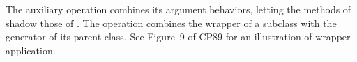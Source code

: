 \begin{AgdaAlign}
The auxiliary operation  combines its argument behaviors,
letting the methods of  shadow those of .
The operation  combines the wrapper of a subclass with the generator of its parent class.
See Figure~9 of CP89 for an illustration of wrapper application.
%
\begin{code}%
%
\>[2]\AgdaSpace{}%
\AgdaSymbol{=}\AgdaSpace{}%
\AgdaSpace{}%
\AgdaSpace{}%
\AgdaSpace{}%
\AgdaSpace{}%
\AgdaSpace{}%
\AgdaSpace{}%
\<%
\\
%
\>[2]%
\>[12]\AgdaSymbol{=}\AgdaSpace{}%
\AgdaSpace{}%
\AgdaSpace{}%
\AgdaSpace{}%
\AgdaSpace{}%
\AgdaSpace{}%
\AgdaSpace{}%
\AgdaSpace{}%
\AgdaSpace{}%
\AgdaSpace{}%
\AgdaSpace{}%
\<%
\\
%
\\[\AgdaEmptyExtraSkip]%
%
\>[2]\AgdaSpace{}%
\AgdaSymbol{:}\AgdaSpace{}%
\AgdaSpace{}%
\AgdaSpace{}%
\AgdaSpace{}%
\AgdaSpace{}%
\AgdaSpace{}%
\AgdaSpace{}%
\AgdaSpace{}%
\AgdaSpace{}%
\AgdaSpace{}%
\AgdaSpace{}%
\<%
\\
%
\>[2]\AgdaSpace{}%
\AgdaSpace{}%
\AgdaSpace{}%
\AgdaSymbol{=}\AgdaSpace{}%
\AgdaSpace{}%
\AgdaSpace{}%
\AgdaSpace{}%
\<%
\\
\>[2][@{}l@{\AgdaIndent{0}}]%
\>[4]\AgdaOperator{\AgdaBound{[}}\AgdaSpace{}%
\AgdaSymbol{(}\AgdaSpace{}%
\AgdaSpace{}%
\AgdaSpace{}%
\AgdaSpace{}%
\AgdaSpace{}%
\AgdaSpace{}%

\end{code}
\end{AgdaAlign}
